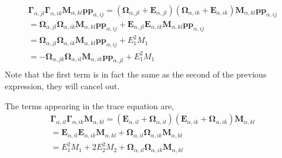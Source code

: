 \begin{align*}
    \bm\Gamma_{\alpha,jl} \bm\Gamma_{\alpha,ik} \textbf{M}_{\alpha,kl} \textbf{pp}_{\alpha,ij}
    = 
    (\bm\Omega_{\alpha,jl}+\textbf{E}_{\alpha,jl}) (\bm\Omega_{\alpha,ik}+\textbf{E}_{\alpha,ik}) \textbf{M}_{\alpha,kl} \textbf{pp}_{\alpha,ij}\\
    = 
    \bm\Omega_{\alpha,jl}\bm\Omega_{\alpha,ik}\textbf{M}_{\alpha,kl} \textbf{pp}_{\alpha,ij}
    + \textbf{E}_{\alpha,jl} \textbf{E}_{\alpha,ik} \textbf{M}_{\alpha,kl} \textbf{pp}_{\alpha,ij}\\
    = 
    \bm\Omega_{\alpha,jl}
    \bm\Omega_{\alpha,ik}
    \textbf{M}_{\alpha,kl} 
    \textbf{pp}_{\alpha,ij}
    + E_1^2 M_1 \\
    = 
    - 
    \bm\Omega_{\alpha,jk}
    \bm\Omega_{\alpha,il}
    \textbf{M}_{\alpha,ik} 
    \textbf{pp}_{\alpha,jl}
    + E_1^2 M_1 \\
\end{align*}
Note that the first term is in fact the same as the second of the previous expression, they will cancel out. 

The terms appearing in the trace equation are,
\begin{align*}
    \bm\Gamma_{\alpha,il} \bm\Gamma_{\alpha,ik} \textbf{M}_{\alpha,kl}
    = 
    (\textbf{E}_{\alpha,il} + \bm\Omega_{\alpha,il}) 
    (\textbf{E}_{\alpha,ik} + \bm\Omega_{\alpha,ik})
    \textbf{M}_{\alpha,kl}\\
    = 
    \textbf{E}_{\alpha,il} 
    \textbf{E}_{\alpha,ik} 
    \textbf{M}_{\alpha,kl}
    + 
    \bm\Omega_{\alpha,il}
    \bm\Omega_{\alpha,ik}
    \textbf{M}_{\alpha,kl}\\
    = 
    E_1^2M_1
    +2E_2^2M_2
    + 
    \bm\Omega_{\alpha,il}
    \bm\Omega_{\alpha,ik}
    \textbf{M}_{\alpha,kl}\\
\end{align*}

